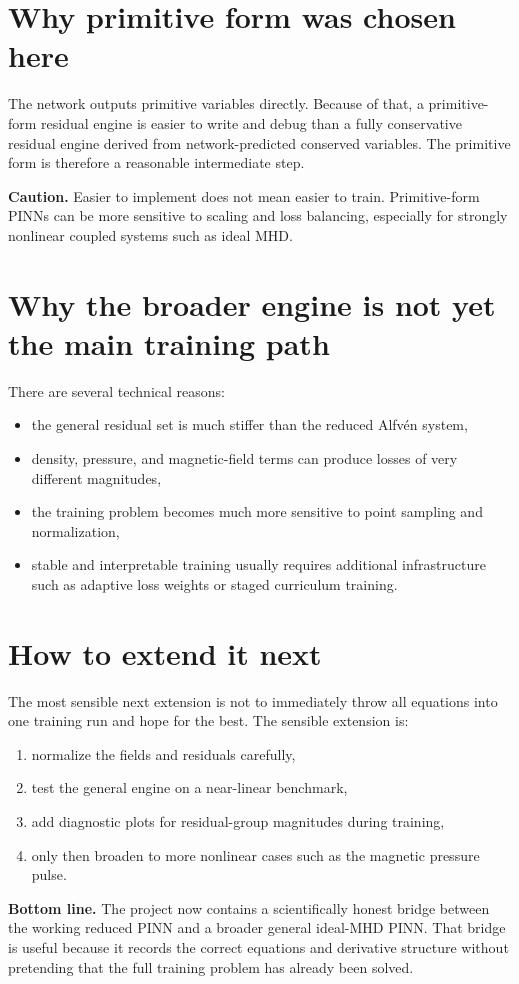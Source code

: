 \documentclass[11pt]{article}
\begin{document}
\section{Why primitive form was chosen here}
The network outputs primitive variables directly. Because of that, a primitive-form residual engine is easier to write and debug than a fully conservative residual engine derived from network-predicted conserved variables. The primitive form is therefore a reasonable intermediate step.

\begin{implbox}
\textbf{Caution.} Easier to implement does not mean easier to train. Primitive-form PINNs can be more sensitive to scaling and loss balancing, especially for strongly nonlinear coupled systems such as ideal MHD.
\end{implbox}

\section{Why the broader engine is not yet the main training path}
There are several technical reasons:
\begin{itemize}[leftmargin=1.8em]
    \item the general residual set is much stiffer than the reduced Alfv\'en system,
    \item density, pressure, and magnetic-field terms can produce losses of very different magnitudes,
    \item the training problem becomes much more sensitive to point sampling and normalization,
    \item stable and interpretable training usually requires additional infrastructure such as adaptive loss weights or staged curriculum training.
\end{itemize}

\section{How to extend it next}
The most sensible next extension is not to immediately throw all equations into one training run and hope for the best. The sensible extension is:
\begin{enumerate}[leftmargin=1.8em]
    \item normalize the fields and residuals carefully,
    \item test the general engine on a near-linear benchmark,
    \item add diagnostic plots for residual-group magnitudes during training,
    \item only then broaden to more nonlinear cases such as the magnetic pressure pulse.
\end{enumerate}

\begin{overviewbox}
\textbf{Bottom line.} The project now contains a scientifically honest bridge between the working reduced PINN and a broader general ideal-MHD PINN. That bridge is useful because it records the correct equations and derivative structure without pretending that the full training problem has already been solved.
\end{overviewbox}
\end{document}

